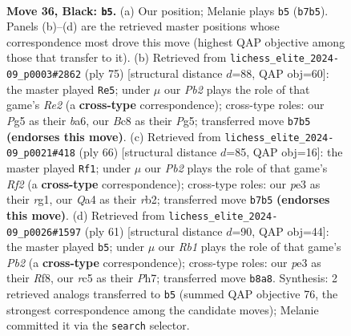 \documentclass[11pt]{article}
\begin{document}
\clearpage

\begin{figure}[p]\centering
\begin{subfigure}{0.46\textwidth}\centering
\resizebox{\linewidth}{!}{%
\newchessgame
\chessboard[
  setfen={1rb2k2/1p5p/r2n4/2R3p1/q7/4P1P1/P4PKP/B2QR3 b - - 1 36},
  showmover=false,
  pgfstyle=straightmove, color=movearrow, markmove={b7-b5}
]}
\caption{}
\end{subfigure}\hfill
\begin{subfigure}{0.46\textwidth}\centering
\resizebox{\linewidth}{!}{%
\newchessgame
\chessboard[
  setfen={3r2k1/2q1rp2/B7/1PP3pp/2Qpp3/2n4P/5PP1/2R1R1K1 b - - 0 38},
  showmover=false,
  pgfstyle=straightmove, color=movearrow, markmove={e7-e5}
]}
\caption{}
\end{subfigure}
\\[4pt]
\begin{subfigure}{0.46\textwidth}\centering
\resizebox{\linewidth}{!}{%
\newchessgame
\chessboard[
  setfen={5k2/1p3p2/4pP1p/p2pP3/P2qb3/8/1r2BR1P/R1Q1K1r1 w - - 1 34},
  showmover=false,
  pgfstyle=straightmove, color=movearrow, markmove={f2-f1}
]}
\caption{}
\end{subfigure}\hfill
\begin{subfigure}{0.46\textwidth}\centering
\resizebox{\linewidth}{!}{%
\newchessgame
\chessboard[
  setfen={2r2r1k/pp5p/2bR2p1/4Pp2/2q2P1P/P1N5/1PQ3P1/K6R b - - 1 31},
  showmover=false,
  pgfstyle=straightmove, color=movearrow, markmove={b7-b5}
]}
\caption{}
\end{subfigure}
\caption{\textbf{Move 36, Black: \texttt{b5}.} (a) Our position; Melanie plays \texttt{b5} (\texttt{b7b5}). Panels (b)--(d) are the retrieved master positions whose correspondence most drove this move (highest QAP objective among those that transfer to it). (b) Retrieved from \texttt{lichess\_elite\_2024-09\_p0003\#2862} (ply 75) [structural distance $d$=88, QAP obj=60]: the master played \texttt{Re5}; under $\mu$ our \emph{Pb2} plays the role of that game's \emph{Re2} (a \textbf{cross-type} correspondence); cross-type roles: our \emph{P}g5 as their \emph{b}a6, our \emph{B}c8 as their \emph{P}g5; transferred move \texttt{b7b5} \textbf{(endorses this move)}. (c) Retrieved from \texttt{lichess\_elite\_2024-09\_p0021\#418} (ply 66) [structural distance $d$=85, QAP obj=16]: the master played \texttt{Rf1}; under $\mu$ our \emph{Pb2} plays the role of that game's \emph{Rf2} (a \textbf{cross-type} correspondence); cross-type roles: our \emph{p}e3 as their \emph{r}g1, our \emph{Q}a4 as their \emph{r}b2; transferred move \texttt{b7b5} \textbf{(endorses this move)}. (d) Retrieved from \texttt{lichess\_elite\_2024-09\_p0026\#1597} (ply 61) [structural distance $d$=90, QAP obj=44]: the master played \texttt{b5}; under $\mu$ our \emph{Rb1} plays the role of that game's \emph{Pb2} (a \textbf{cross-type} correspondence); cross-type roles: our \emph{p}e3 as their \emph{R}f8, our \emph{r}c5 as their \emph{P}h7; transferred move \texttt{b8a8}. Synthesis: 2 retrieved analogs transferred to \texttt{b5} (summed QAP objective 76, the strongest correspondence among the candidate moves); Melanie committed it via the \texttt{search} selector.}
\label{fig:thought-m71}
\end{figure}
\end{document}
